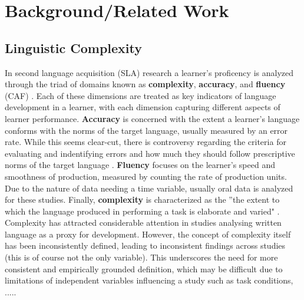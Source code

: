 \chapter{Background/Related Work}

\section{Linguistic Complexity}

In second language acquisition (SLA) research a learner's proficency is analyzed through the triad of domains known
as \textbf{complexity}, \textbf{accuracy}, and \textbf{fluency} (CAF) \cite{Skehan1989,ellis2003}. Each of these
dimensions are treated as key indicators of language development in a learner, with each dimension capturing different
aspects of learner performance. \textbf{Accuracy} is concerned with the extent a learner's language conforms with
the norms of the target language, usually measured by an error rate. While this seems clear-cut, there is
controversy regarding the criteria for evaluating and indentifying errors and how much they should follow
prescriptive norms of the target language \cite{housen2009}. \textbf{Fluency} focuses on the learner's
speed and smoothness of production, measured by counting the rate of production units. Due to the nature of data
needing a time variable, usually oral data is analyzed for these studies. Finally,
\textbf{complexity} is characterized as the ”the extent to which the language
produced in performing a task is elaborate
and varied" \cite{ellis2003}. Complexity has attracted considerable attention
in studies analysing written language as a proxy for development. However, the concept of complexity itself has
been inconsistently defined, leading to inconsistent findings across studies (this is of course not the only variable).
This underscores the need for more consistent and empirically grounded definition, which may be difficult due to
limitations of independent variables influencing a study such as task conditions, .....


